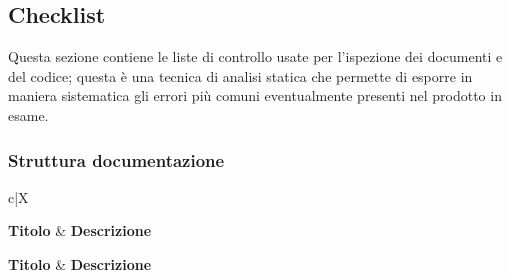 {{{{{{{{%


\subsection{Checklist }
Questa sezione contiene le liste di controllo usate per l'ispezione dei documenti e del codice; questa è una tecnica di analisi statica che permette di esporre in maniera sistematica gli errori più comuni eventualmente presenti nel prodotto in esame.
\subsubsection{Struttura documentazione}

{\renewcommand{\arraystretch}{1.5}
\begin{table}[H]
\begin{xltabular}{\textwidth}{c|X}


\textbf{Titolo} & \textbf{Descrizione}   \\
\endfirsthead

\textbf{Titolo} & \textbf{Descrizione}   \\
\endhead

 \\
\endfoot


\end{xltabular}
\end{table}}}}}}}}}}
